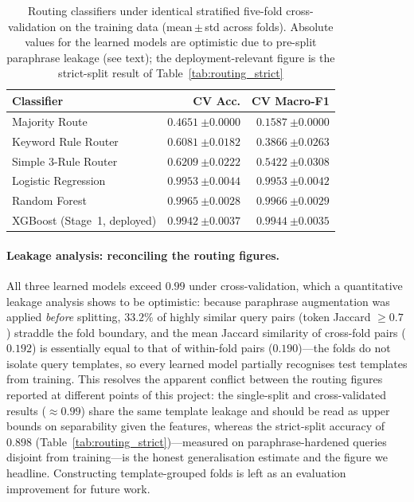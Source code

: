 \documentclass[pdflatex,sn-mathphys-num]{sn-jnl}
\newcommand{\ci}[1]{\ensuremath{\scriptstyle\pm #1}}
\begin{document}
\begin{table}[!htbp]
\centering
\caption{Routing classifiers under identical stratified five-fold
cross-validation on the training data (mean\,$\pm$\,std across folds).
Absolute values for the learned models are optimistic due to pre-split
paraphrase leakage (see text); the deployment-relevant figure is the
strict-split result of Table~\ref{tab:routing_strict}}\label{tab:routing_cv}
\begin{tabular}{lrr}
\toprule
\textbf{Classifier} & \textbf{CV Acc.} & \textbf{CV Macro-F1} \\
\midrule
Majority Route        & $0.4651\ \ci{0.0000}$ & $0.1587\ \ci{0.0000}$ \\
Keyword Rule Router   & $0.6081\ \ci{0.0182}$ & $0.3866\ \ci{0.0263}$ \\
Simple 3-Rule Router  & $0.6209\ \ci{0.0222}$ & $0.5422\ \ci{0.0308}$ \\
Logistic Regression   & $0.9953\ \ci{0.0044}$ & $0.9953\ \ci{0.0042}$ \\
Random Forest         & $0.9965\ \ci{0.0028}$ & $0.9966\ \ci{0.0029}$ \\
XGBoost (Stage~1, deployed) & $0.9942\ \ci{0.0037}$ & $0.9944\ \ci{0.0035}$ \\
\bottomrule
\end{tabular}
\end{table}

\paragraph{Leakage analysis: reconciling the routing figures.}
All three learned models exceed $0.99$ under cross-validation, which a
quantitative leakage analysis shows to be optimistic: because paraphrase
augmentation was applied \emph{before} splitting, $33.2\%$ of highly similar
query pairs (token Jaccard $\ge 0.7$) straddle the fold boundary, and the
mean Jaccard similarity of cross-fold pairs ($0.192$) is essentially equal to
that of within-fold pairs ($0.190$)---the folds do not isolate query
templates, so every learned model partially recognises test templates from
training. This resolves the apparent conflict between the routing figures
reported at different points of this project: the single-split and
cross-validated results ($\approx 0.99$) share the same template leakage and
should be read as upper bounds on separability given the features, whereas
the strict-split accuracy of $0.898$
(Table~\ref{tab:routing_strict})---measured on paraphrase-hardened queries
disjoint from training---is the honest generalisation estimate and the figure
we headline. Constructing template-grouped folds is left as an evaluation
improvement for future work.
\end{document}
